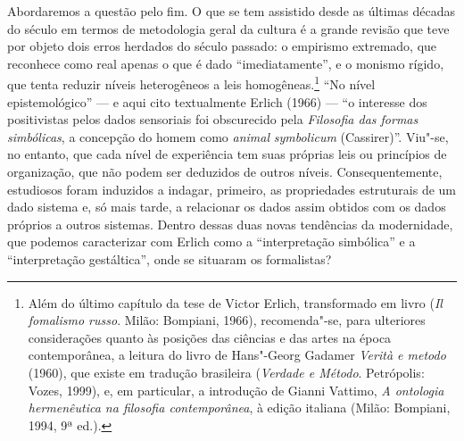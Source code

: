 Abordaremos a questão pelo fim. O que se tem assistido desde as últimas
décadas do século  em termos de metodologia geral da cultura é a
grande revisão que teve por objeto dois erros herdados do século
passado: o empirismo extremado, que reconhece como real apenas o que é
dado ``imediatamente'', e o monismo rígido, que tenta reduzir níveis
heterogêneos a leis homogêneas.\footnote{Além do último capítulo da
  tese de Victor Erlich, transformado em livro (\emph{Il fomalismo
  russo}. Milão: Bompiani, 1966), recomenda"-se, para ulteriores
  considerações quanto às posições das ciências e das
  artes na época contemporânea, a leitura do livro de Hans"-Georg Gadamer
  \emph{Verità e metodo} (1960), que existe em tradução brasileira
  (\emph{Verdade e Método}. Petrópolis: Vozes, 1999), e, em particular, a introdução
  de Gianni Vattimo, \emph{A ontologia hermenêutica na filosofia contemporânea}, à edição italiana (Milão: Bompiani, 1994, 9ª ed.).} ``No nível epistemológico'' --- e aqui cito textualmente Erlich (1966) --- ``o interesse dos
positivistas pelos dados sensoriais foi obscurecido pela \emph{Filosofia
das formas simbólicas}, a concepção do homem como \emph{animal}
\emph{symbolicum} (Cassirer)''.
Viu"-se, no entanto, que cada nível de experiência tem suas próprias leis ou
princípios de organização, que não podem ser deduzidos de outros níveis.
Consequentemente, estudiosos foram induzidos a indagar, primeiro, as
propriedades estruturais de um dado sistema e, só mais tarde, a
relacionar os dados assim obtidos com os dados próprios a outros
sistemas. Dentro dessas duas novas tendências da modernidade, que
podemos caracterizar com Erlich como a ``interpretação simbólica'' e a
``interpretação gestáltica'', onde se situaram os formalistas?

